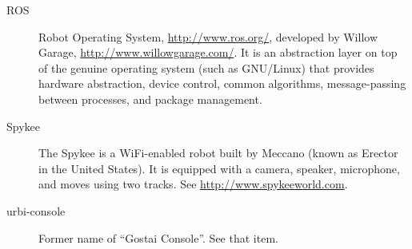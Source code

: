 \begin{description}
\item[ROS] Robot Operating System, \url{http://www.ros.org/}, developed by
  Willow Garage, \url{http://www.willowgarage.com/}.  It is an abstraction
  layer on top of the genuine operating system (such as GNU/Linux) that
  provides hardware abstraction, device control, common algorithms,
  message-passing between processes, and package management.

\item[Spykee] The Spykee is a WiFi-enabled robot built by Meccano (known as
  Erector in the United States). It is equipped with a camera, speaker,
  microphone, and moves using two tracks. See
  \url{http://www.spykeeworld.com}.

\item[urbi-console] Former name of ``Gostai Console''.  See that item.
\end{description}

